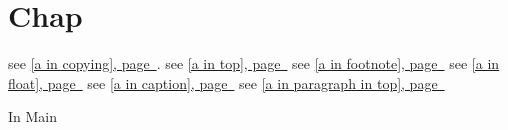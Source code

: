 \documentclass{book}
\newcommand{\Texinfothechapterheading}{}
\newcommand{\Texinfoheadingchaptername}{\chaptername}
\newcommand{\Texinfochapter}[1]{\chapter{#1}
\renewcommand{\Texinfothechapterheading}{\Texinfoheadingchaptername{} \thechapter{} }%
}%
\renewcommand{\_}{\Texinfounderscore\discretionary{}{}{}}
\begin{document}
\label{anchor:Top}%
\label{anchor:a-in-top}%
\label{anchor:a-in-paragraph-in-top}%
\label{anchor:a-in-float}%
\label{anchor:My-Flist}%
\Texinfochapter{{Chap}}
\label{anchor:chapter}%

see \hyperref[anchor:a-in-copying]{[a in copying], page~\pageref*{anchor:a-in-copying}}.
see \hyperref[anchor:a-in-top]{[a in top], page~\pageref*{anchor:a-in-top}}
see \hyperref[anchor:a-in-footnote]{[a in footnote], page~\pageref*{anchor:a-in-footnote}}
see \hyperref[anchor:a-in-float]{[a in float], page~\pageref*{anchor:a-in-float}}
see \hyperref[anchor:a-in-caption]{[a in caption], page~\pageref*{anchor:a-in-caption}}
see \hyperref[anchor:a-in-paragraph-in-top]{[a in paragraph in top], page~\pageref*{anchor:a-in-paragraph-in-top}}

%

\printindex[cp]

\begin{TexinfoFloatlist}
In Main
\caption{Caption Main}
\label{anchor:Main-Flist}%
\end{TexinfoFloatlist}

\end{document}
